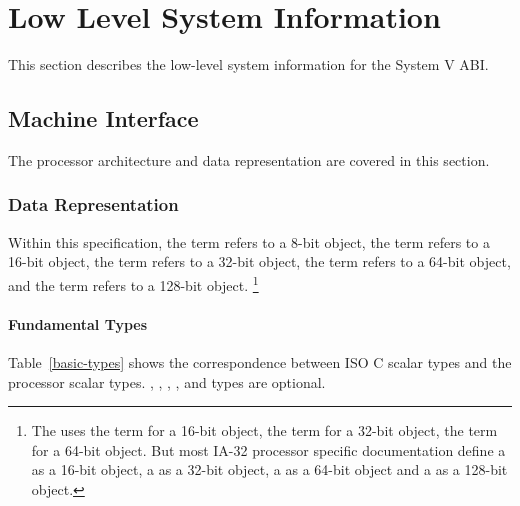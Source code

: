 \chapter{Low Level System Information}

This section describes the low-level system information for the
\xARCH System V ABI.

\section{Machine Interface}

The \xARCH processor architecture and data representation are covered in
this section.

\subsection{Data Representation}
\label{data_representation}

Within this specification, the term \emph{\textindex{\byte{}}} refers to
a 8-bit object, the term \emph{\textindex{\twobyte{}}} refers to a 16-bit
object, the term \emph{\textindex{\fourbyte{}}} refers to a 32-bit
object, the term \emph{\textindex{\eightbyte{}}} refers to a 64-bit
object, and the term \emph{\textindex{\sixteenbyte{}}} refers to a
128-bit object.%
\footnote{The \intelabi uses the term \emph{} for
  a 16-bit object, the term \emph{} for a 32-bit
  object, the term \emph{} for a 64-bit object.  But
  most IA-32 processor specific documentation define a
  \emph{} as a 16-bit object, a
  \emph{} as a 32-bit object, a
  \emph{} as a 64-bit object and a
  \emph{} as a 128-bit object.}

\subsubsection{Fundamental Types}

Table~\ref{basic-types} shows the correspondence between ISO C
scalar types and the processor scalar types.  ,
, , ,  and
 types are optional.

